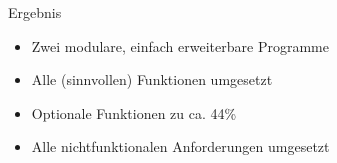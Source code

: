 \begin{frame}{Ergebnis}
    \begin{itemize}
      \item Zwei modulare, einfach erweiterbare Programme
      \pause
      \item Alle (sinnvollen) Funktionen umgesetzt
      \item Optionale Funktionen zu ca. 44\%
      \pause
      \item Alle nichtfunktionalen Anforderungen umgesetzt
    \end{itemize}
\end{frame} 